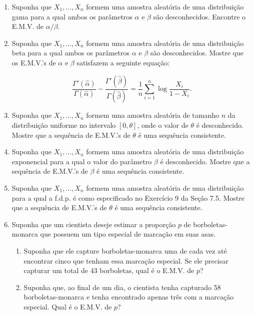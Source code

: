 \begin{enumerate}
    \item Suponha que $X_1, \dots, X_n$ formem uma amostra aleatória de uma distribuição gama para a qual ambos os parâmetros $\alpha$ e $\beta$ são desconhecidos. Encontre o E.M.V. de $\alpha/\beta$.
    
    \item Suponha que $X_1, \dots, X_n$ formem uma amostra aleatória de uma distribuição beta para a qual ambos os parâmetros $\alpha$ e $\beta$ são desconhecidos. Mostre que os E.M.V.'s de $\alpha$ e $\beta$ satisfazem a seguinte equação:
    
    $$ \frac{\Gamma'(\hat{\alpha})}{\Gamma(\hat{\alpha})} - \frac{\Gamma'(\hat{\beta})}{\Gamma(\hat{\beta})} = \frac{1}{n}\sum_{i=1}^{n} \log\frac{X_i}{1-X_i}. $$
    
    \item Suponha que $X_1, \dots, X_n$ formem uma amostra aleatória de tamanho $n$ da distribuição uniforme no intervalo $[0, \theta]$, onde o valor de $\theta$ é desconhecido. Mostre que a sequência de E.M.V.'s de $\theta$ é uma sequência consistente.
    
    \item Suponha que $X_1, \dots, X_n$ formem uma amostra aleatória de uma distribuição exponencial para a qual o valor do parâmetro $\beta$ é desconhecido. Mostre que a sequência de E.M.V.'s de $\beta$ é uma sequência consistente.
    
    \item Suponha que $X_1, \dots, X_n$ formem uma amostra aleatória de uma distribuição para a qual a f.d.p. é como especificado no Exercício 9 da Seção 7.5. Mostre que a sequência de E.M.V.'s de $\theta$ é uma sequência consistente.
    
    \item Suponha que um cientista deseje estimar a proporção $p$ de borboletas-monarca que possuem um tipo especial de marcação em suas asas.
    \begin{enumerate}
        \item Suponha que ele capture borboletas-monarca uma de cada vez até encontrar cinco que tenham essa marcação especial. Se ele precisar capturar um total de 43 borboletas, qual é o E.M.V. de $p$?
        \item Suponha que, ao final de um dia, o cientista tenha capturado 58 borboletas-monarca e tenha encontrado apenas três com a marcação especial. Qual é o E.M.V. de $p$?
    \end{enumerate}
    

\end{enumerate}
